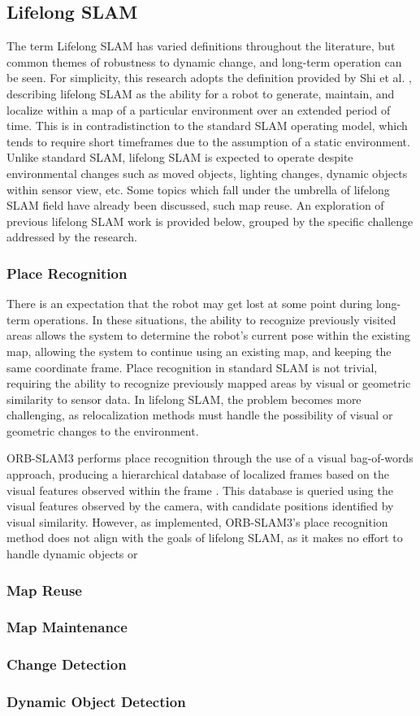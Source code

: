 \subsection{Lifelong SLAM}

The term Lifelong SLAM has varied definitions throughout the literature, but common themes of robustness to dynamic change, and long-term operation can be seen. For simplicity, this research adopts the definition provided by Shi et al. \cite{shiAreWeReady2020}, describing lifelong SLAM as the ability for a robot to generate, maintain, and localize within a map of a particular environment over an extended period of time. This is in contradistinction to the standard SLAM operating model, which tends to require short timeframes due to the assumption of a static environment. Unlike standard SLAM, lifelong SLAM is expected to operate despite environmental changes such as moved objects, lighting changes, dynamic objects within sensor view, etc. Some topics which fall under the umbrella of lifelong SLAM field have already been discussed, such map reuse. An exploration of previous lifelong SLAM work is provided below, grouped by the specific challenge addressed by the research.

\subsubsection{Place Recognition}

There is an expectation that the robot may get lost at some point during long-term operations. In these situations, the ability to recognize previously visited areas allows the system to determine the robot's current pose within the existing map, allowing the system to continue using an existing map, and keeping the same coordinate frame. Place recognition in standard SLAM is not trivial, requiring the ability to recognize previously mapped areas by visual or geometric similarity to sensor data. In lifelong SLAM, the problem becomes more challenging, as relocalization methods must handle the possibility of visual or geometric changes to the environment.

ORB-SLAM3 performs place recognition through the use of a visual bag-of-words approach, producing a hierarchical database of localized frames based on the visual features observed within the frame \cite{camposORBSLAM3AccurateOpenSource2021}\cite{galvez-lopezBagsBinaryWords2012}. This database is queried using the visual features observed by the camera, with candidate positions identified by visual similarity. However, as implemented, ORB-SLAM3's place recognition method does not align with the goals of lifelong SLAM, as it makes no effort to handle dynamic objects or 

\subsubsection{Map Reuse}
\subsubsection{Map Maintenance}
\subsubsection{Change Detection}
\subsubsection{Dynamic Object Detection}

